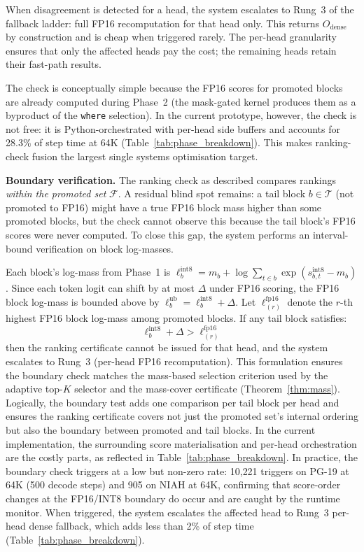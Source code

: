 \documentclass[10pt,twocolumn,a4paper]{article}
\theoremstyle{definition}
\theoremstyle{remark}
\begin{document}
When disagreement is detected for a head, the system escalates to Rung~3 of the fallback ladder: full FP16 recomputation for that head only.  This returns $O_{\mathrm{dense}}$ by construction and is cheap when triggered rarely.  The per-head granularity ensures that only the affected heads pay the cost; the remaining heads retain their fast-path results.

The check is conceptually simple because the FP16 scores for promoted blocks are already computed during Phase~2 (the mask-gated kernel produces them as a byproduct of the \texttt{where} selection).  In the current prototype, however, the check is not free: it is Python-orchestrated with per-head side buffers and accounts for 28.3\% of step time at 64K (Table~\ref{tab:phase_breakdown}).  This makes ranking-check fusion the largest single systems optimisation target.

\textbf{Boundary verification.}  The ranking check as described compares rankings \emph{within the promoted set} $\mathcal{F}$.  A residual blind spot remains: a tail block $b \in \mathcal{T}$ (not promoted to FP16) might have a true FP16 block mass higher than some promoted blocks, but the check cannot observe this because the tail block's FP16 scores were never computed.  To close this gap, the system performs an interval-bound verification on block log-masses.

Each block's log-mass from Phase~1 is $\ell_b^{\mathrm{int8}} = m_b + \log \sum_{t \in b} \exp(s^{\mathrm{int8}}_{b,t} - m_b)$.  Since each token logit can shift by at most $\Delta$ under FP16 scoring, the FP16 block log-mass is bounded above by $\ell_b^{\mathrm{ub}} = \ell_b^{\mathrm{int8}} + \Delta$.  Let $\ell^{\mathrm{fp16}}_{(r)}$ denote the $r$-th highest FP16 block log-mass among promoted blocks.  If any tail block satisfies:
\begin{equation}
  \ell_b^{\mathrm{int8}} + \Delta > \ell^{\mathrm{fp16}}_{(r)}
  \label{eq:boundary_check}
\end{equation}
then the ranking certificate cannot be issued for that head, and the system escalates to Rung~3 (per-head FP16 recomputation).  This formulation ensures the boundary check matches the mass-based selection criterion used by the adaptive top-$K$ selector and the mass-cover certificate (Theorem~\ref{thm:mass}).  Logically, the boundary test adds one comparison per tail block per head and ensures the ranking certificate covers not just the promoted set's internal ordering but also the boundary between promoted and tail blocks.  In the current implementation, the surrounding score materialisation and per-head orchestration are the costly parts, as reflected in Table~\ref{tab:phase_breakdown}.  In practice, the boundary check triggers at a low but non-zero rate: 10{,}221 triggers on PG-19 at 64K (500 decode steps) and 905 on NIAH at 64K, confirming that score-order changes at the FP16/INT8 boundary do occur and are caught by the runtime monitor.  When triggered, the system escalates the affected head to Rung~3 per-head dense fallback, which adds less than 2\% of step time (Table~\ref{tab:phase_breakdown}).
\end{document}

